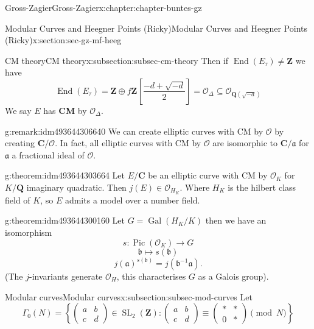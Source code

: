 \documentclass[oneside,10pt,]{book}
\newcommand{\terminology}[1]{\textbf{#1}}
\numberwithin{equation}{section}
\newcommand{\ideal}[1]{\mathfrak{#1}}
\newcommand{\inv}{^{-1}}
\newcommand{\lb}{[}
\newcommand{\rb}{]}
\newcommand{\ZZ}{\mathbf{Z}}
\newcommand{\QQ}{\mathbf{Q}}
\newcommand{\CC}{\mathbf{C}}
\newcommand{\ints}{\mathcal{O}}
\DeclareMathOperator{\End}{End}
\DeclareMathOperator{\Pic}{Pic}
\newcommand{\Gal}[2]{\operatorname{Gal}(#1/#2)}
\DeclareMathOperator{\SL}{SL}
\newcommand{\amp}{&}
\begin{document}
\begin{chapterptx}{Gross-Zagier}{}{Gross-Zagier}{}{}{x:chapter:chapter-buntes-gz}
\begin{sectionptx}{Modular Curves and Heegner Points (Ricky)}{}{Modular Curves and Heegner Points (Ricky)}{}{}{x:section:sec-gz-mf-heeg}
\begin{subsectionptx}{CM theory}{}{CM theory}{}{}{x:subsection:subsec-cm-theory}
Then if \(\End(E_\tau ) \ne \ZZ\) we have%
\begin{equation*}
\End(E_\tau ) = \ZZ \oplus f \ZZ \left\lb \frac {-d + \sqrt{-d}}{2} \right \rb = \ints_\Delta  \subseteq \ints_{\QQ(\sqrt{-d})}
\end{equation*}
We say \(E\) has \terminology{CM} by \(\ints_\Delta \).%
\begin{remark}{}{g:remark:idm493644306640}%
We can create elliptic curves with CM by \(\ints\) by creating \(\CC/\ints\). In fact, all elliptic curves with  CM by \(\ints\) are isomorphic to \(\CC/\ideal a\) for \(\ideal a\) a fractional ideal of \(\ints\).%
\end{remark}
\begin{theorem}{}{}{g:theorem:idm493644303664}%
Let \(E/\CC\) be an elliptic curve with CM by \(\ints_K\) for \(K/\QQ\) imaginary quadratic. Then \(j(E) \in \ints_{H_K}\). Where \(H_K\) is the hilbert class field of \(K\), so \(E\) admits a model over a number field.%
\end{theorem}
\begin{theorem}{}{}{g:theorem:idm493644300160}%
Let \(G = \Gal{H_K}{K}\) then we have an isomorphism%
\begin{equation*}
s\colon  \Pic(\ints_K) \to G
\end{equation*}
%
\begin{equation*}
\ideal b\mapsto s(\ideal b)
\end{equation*}
%
\begin{equation*}
j(\ideal a)^{s(\ideal b)} = j(\ideal b \inv \ideal a)\text{.}
\end{equation*}
(The \(j\)-invariants generate \(\ints_H\), this characterises \(G\) as a Galois group).%
\end{theorem}
\end{subsectionptx}
%
%
\typeout{************************************************}
\typeout{************************************************}
%
\begin{subsectionptx}{Modular curves}{}{Modular curves}{}{}{x:subsection:subsec-mod-curves}
Let%
\begin{equation*}
\Gamma_0 (N) = \left\{\begin{pmatrix} a \amp b \\ c \amp d \end{pmatrix}\in \SL_2(\ZZ) : \begin{pmatrix} a \amp b \\ c \amp d \end{pmatrix} \equiv \begin{pmatrix} \ast \amp \ast \\ 0 \amp \ast \end{pmatrix} \pmod N\right\}

\end{equation*}
\end{subsectionptx}
\end{sectionptx}
\end{chapterptx}
\end{document}
